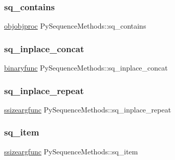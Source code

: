 \subsubsection{\texorpdfstring{sq\_contains}{sq\_contains}}
{\footnotesize\ttfamily \mbox{\hyperlink{_python27_2object_8h_a07f4ce603d3e8e0515b0e3be042531cc}{objobjproc}} Py\+Sequence\+Methods\+::sq\+\_\+contains}

\mbox{\label{struct_py_sequence_methods_affec621f1814e2cff5abb2d907f9bf59}} 
\subsubsection{\texorpdfstring{sq\_inplace\_concat}{sq\_inplace\_concat}}
{\footnotesize\ttfamily \mbox{\hyperlink{_python27_2object_8h_a1a50b2d154f36acb9d215f2cdc1561a8}{binaryfunc}} Py\+Sequence\+Methods\+::sq\+\_\+inplace\+\_\+concat}

\mbox{\label{struct_py_sequence_methods_a6e8b51006d6635efddd6d5e03514eff8}} 
\subsubsection{\texorpdfstring{sq\_inplace\_repeat}{sq\_inplace\_repeat}}
{\footnotesize\ttfamily \mbox{\hyperlink{_python27_2object_8h_a0c13a44d945e5ad963c3db8584d308cb}{ssizeargfunc}} Py\+Sequence\+Methods\+::sq\+\_\+inplace\+\_\+repeat}

\mbox{\label{struct_py_sequence_methods_ab8d80a68cc44c06a10a746cd5242d943}} 
\subsubsection{\texorpdfstring{sq\_item}{sq\_item}}
{\footnotesize\ttfamily \mbox{\hyperlink{_python27_2object_8h_a0c13a44d945e5ad963c3db8584d308cb}{ssizeargfunc}} Py\+Sequence\+Methods\+::sq\+\_\+item}

